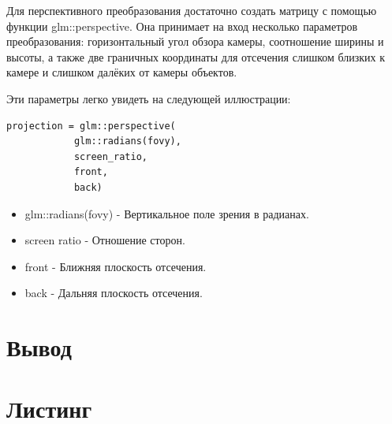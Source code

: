 \documentclass[14pt,a4paper,report]{report}
\begin{document}
Для перспективного преобразования достаточно создать матрицу с помощью функции glm::perspective. Она принимает на вход несколько  параметров преобразования: горизонтальный угол обзора камеры, соотношение ширины и высоты, а также две граничных координаты для отсечения слишком близких к камере и слишком далёких от камеры объектов. 

Эти параметры легко увидеть на следующей иллюстрации:

\begin{figure}[h]
\label{ris:image}
\end{figure}

\begin{lstlisting}
projection = glm::perspective(
            glm::radians(fovy),
            screen_ratio,
            front,
            back)
\end{lstlisting}

\begin{itemize}
\item glm::radians(fovy) - Вертикальное поле зрения в радианах.

\item screen ratio - Отношение сторон.

\item front - Ближняя плоскость отсечения.

\item back - Дальняя плоскость отсечения.

\end{itemize}

\section{Вывод}


\clearpage
\section{Листинг}

\end{document}
